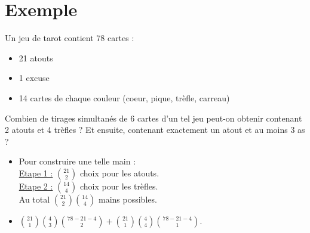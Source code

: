 \documentclass[../main.tex]{subfiles}
\begin{document}
\section{Exemple}
\begin{tcolorbox}[title=Exemple 31.45, title filled=false, colframe=darkgreen, colback=darkgreen!10!white]
    Un jeu de tarot contient 78 cartes : 
    \begin{itemize}
        \item 21 atouts
        \item 1 excuse
        \item 14 cartes de chaque couleur (coeur, pique, trèfle, carreau)
    \end{itemize}
    Combien de tirages simultanés de 6 cartes d'un tel jeu peut-on obtenir contenant 2 atouts et 4 trèfles ? Et ensuite, contenant exactement un atout et au moins 3 as ?
\end{tcolorbox}

\begin{itemize}
    \item Pour construire une telle main : \\
    \underline{Etape 1 :} $\binom{21}{2}$ choix pour les atouts. \\
    \underline{Etape 2 :} $\binom{14}{4}$ choix pour les trèfles. \\
    Au total $\binom{21}{2} \binom{14}{4}$ mains possibles. 
    \item $\binom{21}{1} \binom{4}{3} \binom{78-21-4}{2} + \binom{21}{1} \binom{4}{4}\binom{78-21-4}{1}$.  
\end{itemize}

\end{document}
